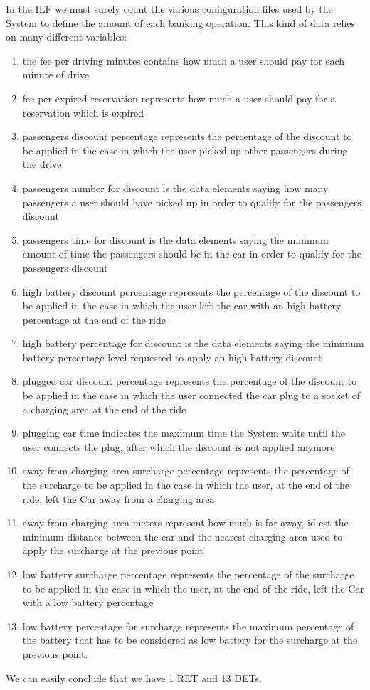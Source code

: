 In the ILF we must surely count the various configuration files used by the System to define the amount of each banking operation. This kind of data relies on many different variables:
\begin{enumerate}
	\item the fee per driving minutes contains how much a user should pay for each minute of drive
	\item fee per expired reservation represents how much a user should pay for a reservation which is expired
	\item passengers discount percentage represents the percentage of the discount to be applied in the case in which the user picked up other passengers during the drive
	\item passengers number for discount is the data elements saying how many passengers a user should have picked up in order to qualify for the passengers discount
	\item passengers time for discount is the data elements saying the minimum amount of time the passengers should be in the car in order to qualify for the passengers discount
	\item high battery discount percentage represents the percentage of the discount to be applied in the case in which the user left the car with an high battery percentage at the end of the ride
	\item high battery percentage for discount  is the data elements saying the minimum battery percentage level requested to apply an high battery discount
	\item plugged car discount percentage represents the percentage of the discount to be applied in the case in which the user connected the car plug to a socket of a charging area at the end of the ride
	\item plugging car time indicates the maximum time the System waits until the user connects the plug, after which the discount is not applied anymore
	\item away from charging area surcharge percentage represents the percentage of the surcharge to be applied in the case in which the user, at the end of the ride, left the Car away from a charging area
	\item away from charging area meters represent how much is far away, id est the minimum distance between the car and the nearest charging area used to apply the surcharge at the previous point
	\item low battery surcharge percentage represents the percentage of the surcharge to be applied in the case in which the user, at the end of the ride, left the Car with a low battery percentage
	\item low battery percentage for surcharge represents the maximum percentage of the battery that has to be considered as low battery for the surcharge at the previous point.
\end{enumerate}
We can easily conclude that we have 1 RET and 13 DETs.
\smallskip

